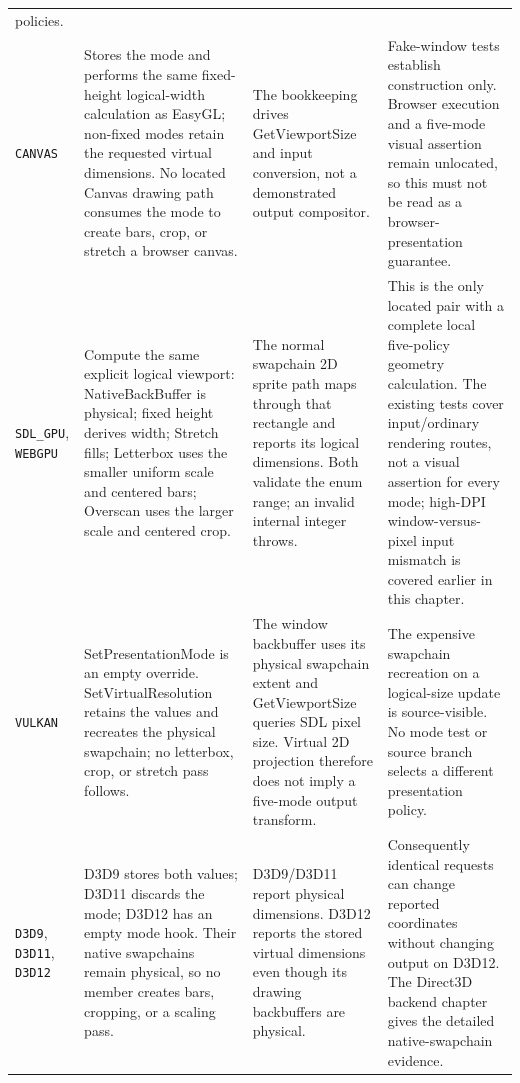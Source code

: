 \begin{longtable}{@{}p{}p{}p{}p{}@{}}
    policies. \\
\texttt{CANVAS}
  & Stores the mode and performs the same fixed-height logical-width calculation as EasyGL;
    non-fixed modes retain the requested virtual dimensions. No located Canvas drawing path
    consumes the mode to create bars, crop, or stretch a browser canvas.
  & The bookkeeping drives GetViewportSize and input conversion, not a demonstrated output
    compositor.
  & Fake-window tests establish construction only. Browser execution and a five-mode visual
    assertion remain unlocated, so this must not be read as a browser-presentation guarantee. \\
\texttt{SDL\_GPU}, \texttt{WEBGPU}
  & Compute the same explicit logical viewport: NativeBackBuffer is physical; fixed height
    derives width; Stretch fills; Letterbox uses the smaller uniform scale and centered bars;
    Overscan uses the larger scale and centered crop.
  & The normal swapchain 2D sprite path maps through that rectangle and reports its logical
    dimensions. Both validate the enum range; an invalid internal integer throws.
  & This is the only located pair with a complete local five-policy geometry calculation. The
    existing tests cover input/ordinary rendering routes, not a visual assertion for every mode;
    high-DPI window-versus-pixel input mismatch is covered earlier in this chapter. \\
\texttt{VULKAN}
  & SetPresentationMode is an empty override. SetVirtualResolution retains the values and
    recreates the physical swapchain; no letterbox, crop, or stretch pass follows.
  & The window backbuffer uses its physical swapchain extent and GetViewportSize queries SDL
    pixel size. Virtual 2D projection therefore does not imply a five-mode output transform.
  & The expensive swapchain recreation on a logical-size update is source-visible. No mode test
    or source branch selects a different presentation policy. \\
\texttt{D3D9}, \texttt{D3D11}, \texttt{D3D12}
  & D3D9 stores both values; D3D11 discards the mode; D3D12 has an empty mode hook. Their native
    swapchains remain physical, so no member creates bars, cropping, or a scaling pass.
  & D3D9/D3D11 report physical dimensions. D3D12 reports the stored virtual dimensions even
    though its drawing backbuffers are physical.
  & Consequently identical requests can change reported coordinates without changing output on
    D3D12. The Direct3D backend chapter gives the detailed native-swapchain evidence. \\

\end{longtable}
